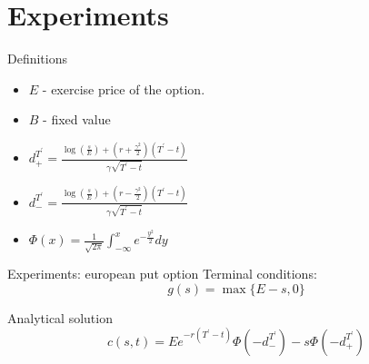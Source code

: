 \documentclass{beamer}
\theoremstyle{definition}
\theoremstyle{plain}
\theoremstyle{remark}
\begin{document}
	\section{Experiments}
		\begin{frame}{Definitions}
	\begin{itemize}

\item $E$ - exercise price of the option.

\item $B$ - fixed value

\item $d^{T^{\prime}}_{+}=\frac{\log(\frac{s}{E})+(r+\frac{\gamma^2}{2})(T^{\prime}-t) } { \gamma\sqrt{T^{\prime}-t}}$

\item $d^{T^{\prime}}_{-}=\frac{\log(\frac{s}{E})+(r-\frac{\gamma^2}{2})(T^{\prime}-t) } { \gamma\sqrt{T^{\prime}-t}}$

\item $\Phi(x) = \frac{1}{\sqrt{2\pi}}\int_{-\infty}^{x}e^{-\frac{y^2}{2}}dy$

\end{itemize}			
			\end{frame}					
			\begin{frame}{Experiments: european put option}
		 	Terminal conditions:
		 \[
			g(s)=\max\{ E-s,0 \}	 
		 \]	
			\begin{block}{Analytical solution}	
	\[
		c(s,t) = Ee^{-r(T^{\prime}-t)}\Phi(-d^{T^{\prime}}_{-} ) - s\Phi(-d^{T^{\prime}}_{+} )	
	\]	
			\end{block}			
		\end{frame}
\end{document}
